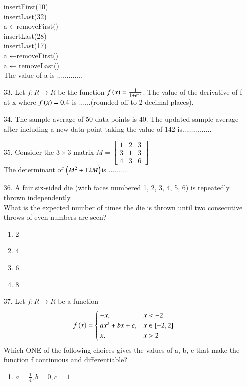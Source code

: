 \documentclass[journal]{IEEEtran}
\begin{document}
\begin{enumerate}
    insertFirst(10)\\
    insertLast(32)\\
    a ←removeFirst()\\
    insertLast(28)\\
    insertLast(17)\\
    a ←removeFirst()\\
    a ← removeLast()\\
    The value of a is .............
    \item[33.] Let $f:R\to R$ be the function $f\left(x\right) = \frac{1}{1+e^{-x}}$. The value of the derivative of f at x where $f\left(x\right) = 0.4$ is ......(rounded off to 2 decimal places).
    \item[34.] The sample average of 50 data points is 40. The updated sample average after
    including a new data point taking the value of 142 is............... 
    \item[35.] Consider the $3\times 3$ matrix $M = \begin{bmatrix}1&2&3\\3&1&3\\4&3&6\end{bmatrix}$ \\ The determinant of $\left(M^2 + 12M\right) $is .......... 
    \item[36.] A fair six-sided die (with faces numbered 1, 2, 3, 4, 5, 6) is repeatedly thrown
    independently.\\
    What is the expected number of times the die is thrown until two consecutive throws
    of even numbers are seen?
    \begin{enumerate}[label = (\Alph*)]
        \item 2
        \item 4
        \item 6
        \item 8
    \end{enumerate}
    \item[37.] Let $f: R\to R$ be a function $$f\left(x\right) = \begin{cases} -x, & x<-2\\ax^2 + bx + c, &x\in [-2,2]\\ x,& x>2\end{cases}$$ 
    Which ONE of the following choices gives the values of a, b, c that make the
    function f continuous and differentiable?
    \begin{enumerate}[label = (\Alph*)]
        \item $a=\frac{1}{4}, b = 0, c=1$

\end{enumerate}
\end{enumerate}
\end{document}
